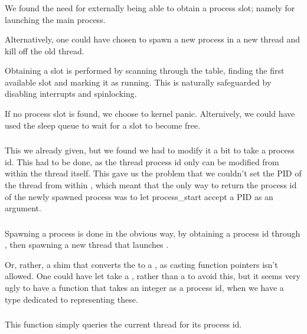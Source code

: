 \subsubsection{}
We found the need for externally being able to obtain a process slot; namely for
launching the main process.

Alternatively, one could have chosen to spawn a new process in a new thread
and kill off the old thread.

Obtaining a slot is performed by scanning through the table, finding the first
available slot and marking it as running. This is naturally safeguarded by
disabling interrupts and spinlocking.

If no process slot is found, we choose to kernel panic. Alternively, we could have
used the sleep queue to wait for a slot to become free.

\subsubsection{}
This we already given, but we found we had to modify it a bit to take a
process id. This had to be done, as the thread process id only can be modified
from within the thread itself. This gave us the problem that we couldn't set the
PID of the thread from within , which meant that the only
way to return the process id of the newly spawned process was to let process\_start
accept a PID as an argument.

\subsubsection{}
Spawning a process is done in the obvious way, by obtaining a process id
through , then spawning a new thread that launches
.

Or, rather, a shim that converts the  to a ,
as casting function pointers isn't allowed. One could have let 
take a , rather than a  to avoid this, but
it seems very ugly to have a function that takes an integer as a process id, when
we have a type dedicated to representing these.

\subsubsection{}
This function simply queries the current thread for its process id.

